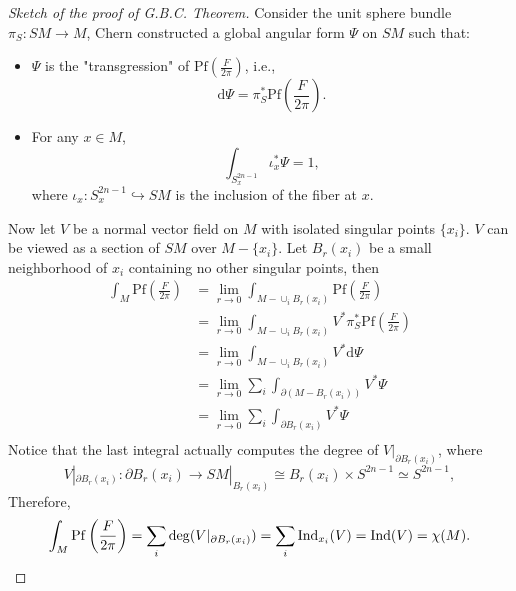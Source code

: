 \begin{proof}[Sketch of the proof of G.B.C. Theorem]
    Consider the unit sphere bundle $\pi_S: SM \to M$, 
    Chern constructed a global angular form $\Psi$ on $SM$ such that: 
    \begin{itemize}[leftmargin=*]
        \item $\Psi$ is the "transgression" of $\mathrm{Pf}\left(\frac{F}{2\pi}\right)$, i.e.,
        \begin{equation}\label{equ:transgression-in-GBC(1)}
            \mathrm{d}\Psi = \pi_S^* \mathrm{Pf}\left(\frac{F}{2\pi}\right). 
        \end{equation}
        \item For any $x \in M$, 
        \begin{equation}\label{equ:transgression-in-GBC(2)}
            \int_{S^{2n-1}_x} \iota_x^* \Psi = 1,
        \end{equation}
        where $\iota_x:S^{2n-1}_x \hookrightarrow SM$ is the inclusion of the fiber at $x$.
    \end{itemize}
    Now let $V$ be a normal vector field on $M$ with isolated singular points $\{x_i\}$. 
    $V$ can be viewed as a section of $SM$ over $M - \{x_i\}$. 
    Let $B_r(x_i)$ be a small neighborhood of $x_i$ containing no other singular points, then 
    \begin{align*}
        \int_M \mathrm{Pf}\left(\frac{F}{2\pi}\right) &= \lim_{r\to 0} \int_{M - \cup_i B_r(x_i)} \mathrm{Pf}\left(\frac{F}{2\pi}\right) \\ 
        &= \lim_{r\to 0} \int_{M - \cup_i B_r(x_i)} V^* \pi_S^* \mathrm{Pf}\left(\frac{F}{2\pi}\right) \\
        &= \lim_{r\to 0} \int_{M - \cup_i B_r(x_i)} V^* \mathrm{d}\Psi \\
        &= \lim_{r\to 0} \sum_i \int_{\partial(M - B_r(x_i))} V^* \Psi \\
        &= \lim_{r\to 0} \sum_i \int_{\partial B_r(x_i)} V^* \Psi \\
    \end{align*}
    Notice that the last integral actually computes the degree of $V|_{\partial B_r(x_i)}$, where
    \begin{equation*}
        V|_{\partial B_r(x_i)}: \partial B_r(x_i) \to SM|_{B_r(x_i)} \cong B_r(x_i) \times S^{2n-1} \simeq S^{2n-1},
    \end{equation*}
    Therefore, 
    \begin{equation*}
        \int_M \mathrm{Pf}\left(\frac{F}{2\pi}\right) = \sum_i \mathrm{deg}(V|_{\partial B_r(x_i)}) = \sum_i \mathrm{Ind}_{x_i}(V) = \mathrm{Ind}(V) = \chi(M). \qedhere
    \end{equation*}
\end{proof}
